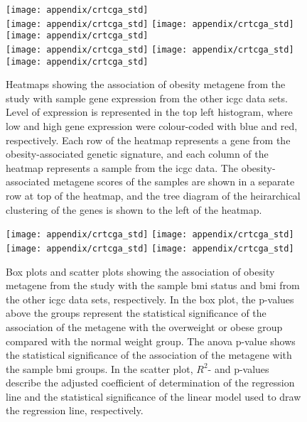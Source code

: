 \begin{appendices}
	\begin{figure}[htp!]
		\centering
		\texttt{[image: appendix/crtcga\_std]}\\
		\vspace{1em}
		\texttt{[image: appendix/crtcga\_std]}
		\texttt{[image: appendix/crtcga\_std]}
		\texttt{[image: appendix/crtcga\_std]}\\
		\vspace{1em}
		\texttt{[image: appendix/crtcga\_std]}
		\texttt{[image: appendix/crtcga\_std]}
		\texttt{[image: appendix/crtcga\_std]}\\
		\caption[Obesity metagene from the \citet{Creighton2012} study and the sample gene expressions in the other \gls{icgc} cancer types]{Heatmaps showing the association of obesity metagene from the \citet{Creighton2012} study with sample gene expression from the other \gls{icgc} data sets.
		Level of expression is represented in the top left histogram, where low and high gene expression were colour-coded with blue and red, respectively.
		Each row of the heatmap represents a gene from the obesity-associated genetic signature, and each column of the heatmap represents a sample from the \gls{icgc} data.
		The obesity-associated metagene scores of the samples are shown in a separate row at top of the heatmap, and the tree diagram of the heirarchical clustering of the genes is shown to the left of the heatmap. }
		\label{fig:appendix/cr_icgc_heatmap}
	\end{figure}

	\begin{figure}[htpb]
		\centering
		\texttt{[image: appendix/crtcga\_std]}
		\hfill
		\texttt{[image: appendix/crtcga\_std]}\\
		\texttt{[image: appendix/crtcga\_std]}
		\hfill
		\texttt{[image: appendix/crtcga\_std]}\\
		\caption[Obesity metagene from the \citet{Creighton2012} study and the sample \gls{bmi}/\gls{bmi} status in the other \gls{icgc} cancer types]{Box plots and scatter plots showing the association of obesity metagene from the \citet{Creighton2012} study with the sample \gls{bmi} status  and \gls{bmi} from the other \gls{icgc} data sets, respectively.
		In the box plot, the p-values above the groups represent the statistical significance of the association of the metagene with the overweight or obese group compared with the normal weight group.
		The \gls{anova} p-value shows the statistical significance of the association of the metagene with the sample \gls{bmi} groups.
		In the scatter plot, $R^2$- and p-values describe the adjusted coefficient of determination of the regression line and the statistical significance of the linear model used to draw the regression line, respectively.}
		\label{fig:appendix/cr_icgc_box_scatter}
	\end{figure}


\end{appendices}
